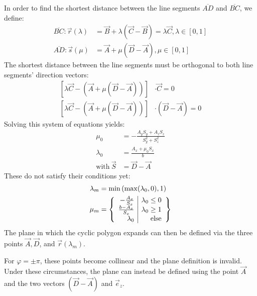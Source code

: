 \documentclass[a4paper]{article}
\begin{document}
In order to find the shortest distance between the line segments $\overline{AD}$
and $\overline{BC}$, we define:
\begin{align}
  \overline{BC}: \vec{r}(\lambda) 
  &= \vec{B} + \lambda\left(\vec{C}-\vec{B}\right)
  = \lambda\vec{C},
  \lambda \in \left[0, 1\right]\\
  \overline{AD}: \vec{s}(\mu) 
  &= \vec{A} + \mu\left(\vec{D}-\vec{A}\right),
  \mu \in \left[0, 1\right]
\end{align}
The shortest distance between the line segments must be orthogonal to both line
segments' direction vectors:
\begin{align}
  \left[\lambda\vec{C} - \left(\vec{A} + \mu(\vec{D}-\vec{A})\right)\right]
  &\cdot\vec{C} = 0\\
  \left[\lambda\vec{C} - \left(\vec{A} +
  \mu(\vec{D}-\vec{A})\right)\right]
  &\cdot\left(\vec{D}-\vec{A}\right) = 0
\end{align}
Solving this system of equations yields:
\begin{align}
  \mu_0 &= - \frac{A_y S_y + A_z S_z}{S_y^2 + S_z^2}\\
  \lambda_0 &= \frac{A_x + \mu_0 S_x}{b}\\
  \textrm{with}\ \vec{S} &= \vec{D} - \vec{A}
\end{align}
These do not satisfy their conditions yet:
\begin{align}
  \lambda_m &= \min\left(\max(\lambda_0, 0), 1\right)\\
  \mu_m &= \left\{
  \begin{array}{r | r}
    -\frac{A_x}{S_x} & \lambda_0 \leq 0\\
    \frac{b - A_x}{S_x} & \lambda_0 \geq 1\\
    \lambda_0 & \textrm{else}
  \end{array}\right\}
\end{align}
The plane in which the cyclic polygon expands can then be defined via the three
points $\vec{A}, \vec{D}$, and $\vec{r}(\lambda_m)$.

For $\varphi = \pm \pi$, these points become collinear and the plane definition
is invalid. Under these circumstances, the plane can instead be defined using
the point $\vec{A}$ and the two vectors $\left(\vec{D}-\vec{A}\right)$ and $\vec{e}_z$.
\end{document}
